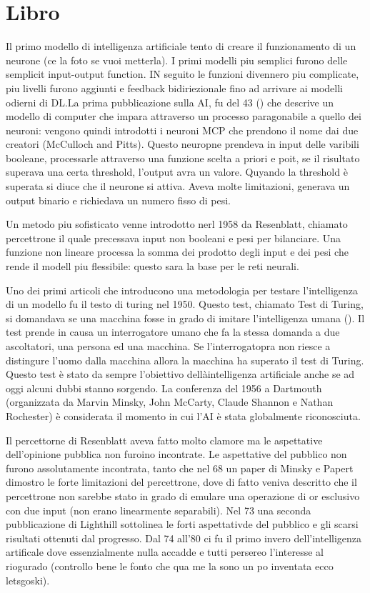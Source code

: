 \section*{Libro}

Il primo modello di intelligenza artificiale tento di creare il funzionamento di un neurone (ce la foto se vuoi metterla). I primi modelli piu semplici furono delle semplicit input-output function. IN seguito le funzioni divennero piu complicate, piu livelli furono aggiunti e feedback bidiriezionale fino ad arrivare ai modelli odierni di DL.\@ La prima pubblicazione sulla AI, fu del 43 (\cite{mcculloch1943logical}) che descrive un modello di computer che impara attraverso un processo paragonabile a quello dei neuroni: vengono quindi introdotti i neuroni MCP che prendono il nome dai due creatori (McCulloch and Pitts). Questo neuropne prendeva in input delle varibili booleane, processarle attraverso una funzione scelta a priori e poit, se il risultato superava una certa threshold, l'output avra un valore. Quyando la threshold è superata si diuce che il neurone si attiva. Aveva molte limitazioni, generava un output binario e richiedava un numero fisso di pesi.

Un metodo piu sofisticato venne introdotto nerl 1958 da Resenblatt, chiamato percettrone il quale precessava input non booleani e pesi per bilanciare. Una funzione non lineare processa la somma dei prodotto degli input e dei pesi che rende il modell piu flessibile: questo sara la base per le reti neurali.

Uno dei primi articoli che introducono una metodologia per testare l'intelligenza di un modello fu il testo di turing nel 1950. Questo test, chiamato Test di Turing, si domandava se una macchina fosse in grado di imitare l'intelligenza umana (\cite[Computing machinery and intelligence]{turing2009computing}). Il test prende in causa un interrogatore umano che fa la stessa domanda a due ascoltatori, una persona ed una macchina. Se l'interrogatopra non riesce a distingure l'uomo dalla macchina allora la macchina ha superato il test di Turing. Questo test è stato da sempre l'obiettivo dellàintelligenza artificiale anche se ad oggi alcuni dubbi stanno sorgendo. La conferenza del 1956 a Dartmouth (organizzata da Marvin Minsky, John McCarty, Claude Shannon e Nathan Rochester) è considerata il momento in cui l'AI è stata globalmente riconosciuta. 

Il percettorne di Resenblatt aveva fatto molto clamore ma le aspettative dell'opinione pubblica non furoino incontrate. Le aspettative del pubblico non furono assolutamente incontrata, tanto che nel 68 un paper di Minsky e Papert dimostro le forte limitazioni del percettrone, dove di fatto veniva descritto che il percettrone non sarebbe stato in grado di emulare una operazione di or esclusivo con due input (non erano linearmente separabili). Nel 73 una seconda pubblicazione di Lighthill sottolinea le forti aspettativde del pubblico e gli scarsi risultati ottenuti dal progresso. Dal 74 all'80 ci fu il primo invero dell'intelligenza artificale dove essenzialmente nulla accadde e tutti persereo l'interesse al riogurado (controllo bene le fonto che qua me la sono un po inventata ecco letsgoski). 

